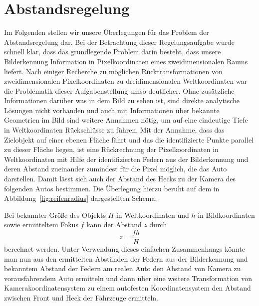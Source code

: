 \documentclass[10pt]{article}
\begin{document}
\section{Abstandsregelung}\label{sec:Abstandsreglung}
    Im Folgenden stellen wir unsere Überlegungen für das Problem der Abstandsregelung dar.
    Bei der Betrachtung dieser Regelungsaufgabe wurde schnell klar, dass das grundlegende Problem darin besteht, dass unsere Bilderkennung Information in Pixelkoordinaten eines zweidimensionalen Raums liefert.
    Nach einiger Recherche zu möglichen Rücktransformationen von zweidimensionalen Pixelkoordinaten zu dreidimensionalen Weltkoordinaten war die Problematik dieser Aufgabenstellung umso deutlicher.
    Ohne zusätzliche Informationen darüber was in dem Bild zu sehen ist, sind direkte analytische Lösungen nicht vorhanden und auch mit Informationen über bekannte Geometrien im Bild sind weitere Annahmen nötig, um auf eine eindeutige Tiefe in Weltkoordinaten Rückschlüsse zu führen.
    Mit der Annahme, dass das Zielobjekt auf einer ebenen Fläche fährt und das die identifizierte Punkte parallel zu dieser Fläche liegen, ist eine Rückrechnung der Pixelkoordinaten in Weltkoordinaten mit Hilfe der identifizierten Federn aus der Bilderkennung und deren Abstand zueinander zumindest für die Pixel möglich, die das Auto darstellen.
    Damit lässt sich auch der Abstand des Hecks zu der Kamera des folgenden Autos bestimmen.
    Die Überlegung hierzu beruht auf dem in Abbildung~\ref{fig:reifenradius} dargestellten Schema.

    Bei bekannter Größe des Objekts $H$ in Weltkoordinaten und $h$ in Bildkoordinaten sowie ermitteltem Fokus $f$ kann der Abstand $z$ durch \[
    z = \frac{fh}{H}
    \] berechnet werden.
    Unter Verwendung dieses einfachen Zusammenhangs könnte man nun aus den ermittelten Abständen der Federn aus der Bilderkennung und bekanntem Abstand der Federn am realen Auto den Abstand von Kamera zu vorausfahrendem Auto ermitteln und dann über eine weitere Transformation von Kamerakoordinatensystem zu einem autofesten Koordinatensystem den Abstand zwischen Front und Heck der Fahrzeuge ermitteln.
\end{document}
